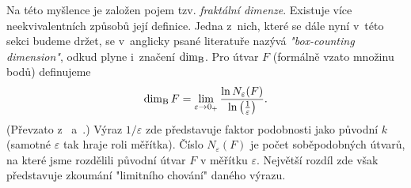 Na této myšlence je založen pojem tzv. \emph{fraktální dimenze}. Existuje více neekvivalentních způsobů její definice. Jedna z~nich, které se dále nyní v~této sekci budeme držet, se v~anglicky psané literatuře nazývá \emph{"box-counting dimension"}, odkud plyne i~značení $\operatorname{dim_B}$. Pro útvar $F$ (formálně vzato množinu bodů) definujeme 
\begin{equation}\label{eq:fraktalni-dimenze}
    \operatorname{dim_B}{F}=\lim_{\varepsilon\to 0_+}{\dfrac{\ln{N_\varepsilon(F)}}{\ln{\left(\frac{1}{\varepsilon}\right)}}}.
\end{equation}
(Převzato z~\cite[str. 93]{Zelinka2006} a~\cite[str. 28]{Falconer2014}.) Výraz $1/\varepsilon$ zde představuje faktor podobnosti jako původní $k$ (samotné $\varepsilon$ tak hraje roli měřítka). Číslo $N_\varepsilon(F)$ je počet soběpodobných útvarů, na které jsme rozdělili původní útvar $F$ v měřítku $\varepsilon$. Největší rozdíl zde však představuje zkoumání "limitního chování" daného výrazu.

